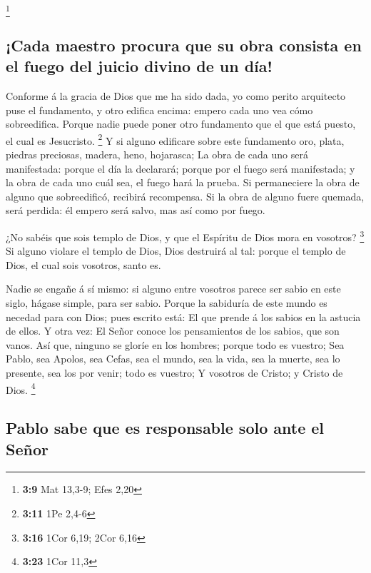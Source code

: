 \footnote{\textbf{3:9} Mat 13,3-9; Efes 2,20}

\hypertarget{cada-maestro-procura-que-su-obra-consista-en-el-fuego-del-juicio-divino-de-un-duxeda}{%
\subsection{¡Cada maestro procura que su obra consista en el fuego del
juicio divino de un
día!}\label{cada-maestro-procura-que-su-obra-consista-en-el-fuego-del-juicio-divino-de-un-duxeda}}

 Conforme á la gracia de Dios que me ha sido dada, yo como
perito arquitecto puse el fundamento, y otro edifica encima: empero cada
uno vea cómo sobreedifica.  Porque nadie puede poner otro
fundamento que el que está puesto, el cual es Jesucristo. \footnote{\textbf{3:11}
  1Pe 2,4-6}  Y si alguno edificare sobre este fundamento
oro, plata, piedras preciosas, madera, heno, hojarasca;  La
obra de cada uno será manifestada: porque el día la declarará; porque
por el fuego será manifestada; y la obra de cada uno cuál sea, el fuego
hará la prueba.  Si permaneciere la obra de alguno que
sobreedificó, recibirá recompensa.  Si la obra de alguno
fuere quemada, será perdida: él empero será salvo, mas así como por
fuego.

 ¿No sabéis que sois templo de Dios, y que el Espíritu de
Dios mora en vosotros? \footnote{\textbf{3:16} 1Cor 6,19; 2Cor 6,16}
 Si alguno violare el templo de Dios, Dios destruirá al
tal: porque el templo de Dios, el cual sois vosotros, santo es.

 Nadie se engañe á sí mismo: si alguno entre vosotros
parece ser sabio en este siglo, hágase simple, para ser sabio.
 Porque la sabiduría de este mundo es necedad para con
Dios; pues escrito está: El que prende á los sabios en la astucia de
ellos.  Y otra vez: El Señor conoce los pensamientos de los
sabios, que son vanos.  Así que, ninguno se gloríe en los
hombres; porque todo es vuestro;  Sea Pablo, sea Apolos,
sea Cefas, sea el mundo, sea la vida, sea la muerte, sea lo presente,
sea los por venir; todo es vuestro;  Y vosotros de Cristo;
y Cristo de Dios. \footnote{\textbf{3:23} 1Cor 11,3}

\hypertarget{pablo-sabe-que-es-responsable-solo-ante-el-seuxf1or}{%
\subsection{Pablo sabe que es responsable solo ante el
Señor}\label{pablo-sabe-que-es-responsable-solo-ante-el-seuxf1or}}

